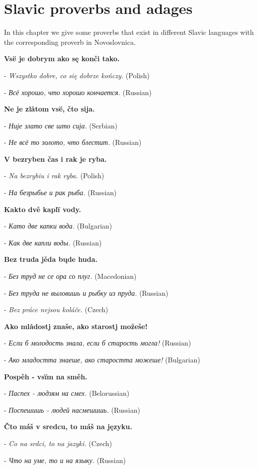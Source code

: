 \section{Slavic proverbs and adages}

In this chapter we give some proverbs that exist in different Slavic languages with the corresponding proverb in Novoslovnica.

\textbf{Vsë je dobrym ako sę konči tako.}

- \textit{Wszystko dobre, co się dobrze kończy.} (Polish)

- \textit{Всё хорошо, что хорошо кончается.} (Russian)

\textbf{Ne je zlåtom vsë, čto sija.}

- \textit{Није злато све што сија.} (Serbian)

- \textit{Не всё то золото, что блестит.} (Russian)

\textbf{V bezryben čas i rak je ryba.}

- \textit{Na bezrybiu i rak ryba.} (Polish)

- \textit{На безрыбье и рак рыба.} (Russian)

\textbf{Kakto dvě kaplï vody.}

- \textit{Като две капки вода.} (Bulgarian)

- \textit{Как две капли воды.} (Russian)

\textbf{Bez truda jěda bųde huda.}

- \textit{Без труд не се ора со плуг.} (Macedonian)

- \textit{Без труда не выловишь и рыбку из пруда.} (Russian)

- \textit{Bez práce nejsou koláče.} (Czech)

\textbf{Ako mlådostj znaše, ako starostj možeše!}

- \textit{Если б молодость знала, если б старость могла!} (Russian)

- \textit{Ако младостта знаеше, ако старостта можеше!} (Bulgarian)

\textbf{Pospěh - vsïm na směh.}

- \textit{Паспех - людзям на смех.} (Belorussian)

- \textit{Поспешишь - людей насмешишь.} (Russian)

\textbf{Čto máš v sredcu, to máš na języku.}

- \textit{Co na srdci, to na jazyki.} (Czech)

- \textit{Что на уме, то и на языку.} (Russian)


